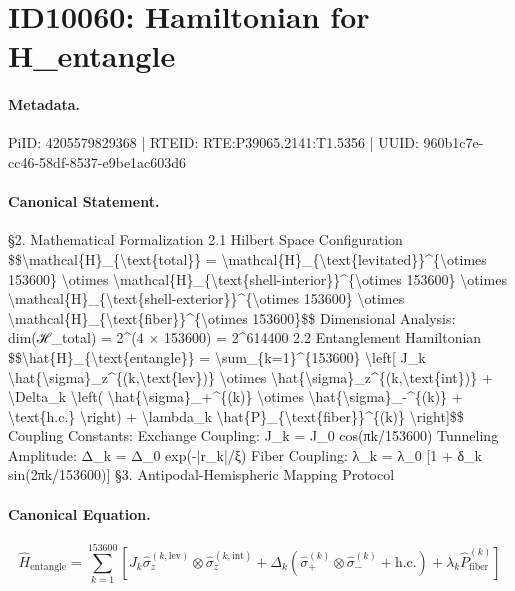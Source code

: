 \section*{ID10060: Hamiltonian for H\_entangle}
\paragraph{Metadata.}
PiID: 4205579829368 | RTEID: RTE:P39065.2141:T1.5356 | UUID: 960b1c7e-cc46-58df-8537-e9be1ac603d6

\paragraph{Canonical Statement.}
§2. Mathematical Formalization 2.1 Hilbert Space Configuration \$\$\textbackslash{}mathcal\{H\}\_\{\textbackslash{}text\{total\}\} = \textbackslash{}mathcal\{H\}\_\{\textbackslash{}text\{levitated\}\}\textasciicircum{}\{\textbackslash{}otimes 153600\} \textbackslash{}otimes \textbackslash{}mathcal\{H\}\_\{\textbackslash{}text\{shell-interior\}\}\textasciicircum{}\{\textbackslash{}otimes 153600\} \textbackslash{}otimes \textbackslash{}mathcal\{H\}\_\{\textbackslash{}text\{shell-exterior\}\}\textasciicircum{}\{\textbackslash{}otimes 153600\} \textbackslash{}otimes \textbackslash{}mathcal\{H\}\_\{\textbackslash{}text\{fiber\}\}\textasciicircum{}\{\textbackslash{}otimes 153600\}\$\$ Dimensional Analysis: dim(ℋ\_total) = 2\textasciicircum{}(4 × 153600) = 2\textasciicircum{}614400 2.2 Entanglement Hamiltonian \$\$\textbackslash{}hat\{H\}\_\{\textbackslash{}text\{entangle\}\} = \textbackslash{}sum\_\{k=1\}\textasciicircum{}\{153600\} \textbackslash{}left[ J\_k \textbackslash{}hat\{\textbackslash{}sigma\}\_z\textasciicircum{}\{(k,\textbackslash{}text\{lev\})\} \textbackslash{}otimes \textbackslash{}hat\{\textbackslash{}sigma\}\_z\textasciicircum{}\{(k,\textbackslash{}text\{int\})\} + \textbackslash{}Delta\_k \textbackslash{}left( \textbackslash{}hat\{\textbackslash{}sigma\}\_+\textasciicircum{}\{(k)\} \textbackslash{}otimes \textbackslash{}hat\{\textbackslash{}sigma\}\_-\textasciicircum{}\{(k)\} + \textbackslash{}text\{h.c.\} \textbackslash{}right) + \textbackslash{}lambda\_k \textbackslash{}hat\{P\}\_\{\textbackslash{}text\{fiber\}\}\textasciicircum{}\{(k)\} \textbackslash{}right]\$\$ Coupling Constants: Exchange Coupling: J\_k = J\_0 cos(πk/153600) Tunneling Amplitude: Δ\_k = Δ\_0 exp(-|r\_k|/ξ) Fiber Coupling: λ\_k = λ\_0 [1 + δ\_k sin(2πk/153600)] §3. Antipodal-Hemispheric Mapping Protocol

\paragraph{Canonical Equation.}
\[
\hat{H}_{\text{entangle}} = \sum_{k=1}^{153600} \left[ J_k \hat{\sigma}_z^{(k,\text{lev})} \otimes \hat{\sigma}_z^{(k,\text{int})} + \Delta_k \left( \hat{\sigma}_+^{(k)} \otimes \hat{\sigma}_-^{(k)} + \text{h.c.} \right) + \lambda_k \hat{P}_{\text{fiber}}^{(k)} \right]
\]

